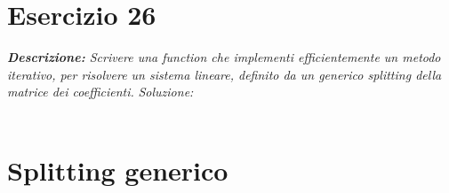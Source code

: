 \section{Esercizio 26}
\textit{\textbf{Descrizione:}  Scrivere una function che implementi efficientemente un metodo iterativo, per risolvere un sistema lineare, definito da un generico splitting della matrice dei coefficienti.}\newline
\emph{Soluzione: }\\~\\
\section*{Splitting generico}
\newpage